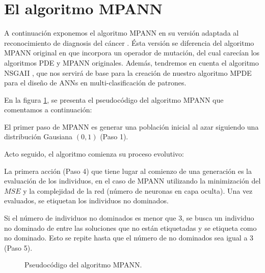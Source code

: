 \section{El algoritmo MPANN}
\noindent A continuación exponemos el algoritmo MPANN \cite{Abbass2001} en su versión
adaptada al reconocimiento de diagnosis del cáncer \cite{Abbass2002a}. Ésta versión
se diferencia del algoritmo MPANN original en que incorpora un operador de mutación, del
cual
carecían los algoritmos PDE y MPANN originales. Además, tendremos en cuenta el algoritmo
NSGAII \cite{Deb2002}, que nos servirá de base para la creación de nuestro algoritmo MPDE para el
diseño de ANNs en multi-clasificación de patrones.

En la figura \ref{diferencial3}, se presenta el pseudocódigo del algoritmo
MPANN que comentamos a continuación:

El primer paso de MPANN es generar una población inicial al azar siguiendo una
distribución Gausiana $(0,1)$ (Paso 1).

Acto seguido, el algoritmo comienza su proceso evolutivo:

La primera acción (Paso 4) que tiene lugar al comienzo de una generación es la evaluación
de los individuos, en el caso de MPANN utilizando la minimización del $MSE$ y la
complejidad
de la red (número de neuronas en capa oculta). Una vez evaluados, se etiquetan los individuos no
dominados.

Si el número de individuos no dominados es menor que 3, se busca un individuo no dominado
de entre las soluciones que no están etiquetadas y se etiqueta como no dominado. Esto se
repite hasta que el número de no dominados sea igual a 3 (Paso 5).
\newpage
\begin{figure}[!htp]
\centering
{}
\caption{Pseudocódigo del algoritmo MPANN.}
\label{diferencial3}
\end{figure}

